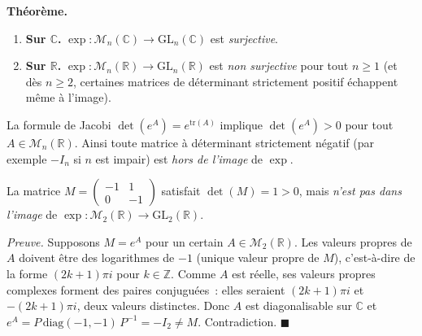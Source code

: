﻿%



\begin{tcolorbox}[thmbox]
  \textbf{Théorème.}\enspace{}
  \begin{enumerate}
    \item \textbf{Sur $\mathbb{C}$.}\enspace
          $\exp : \mathcal{M}_n(\mathbb{C}) \to \mathrm{GL}_n(\mathbb{C})$
          est \emph{surjective}.
    \item \textbf{Sur $\mathbb{R}$.}\enspace
          $\exp : \mathcal{M}_n(\mathbb{R}) \to \mathrm{GL}_n(\mathbb{R})$
          est \emph{non surjective} pour tout $n \geq 1$
          (et dès $n \geq 2$, certaines matrices de déterminant
          strictement positif échappent même à l'image).
  \end{enumerate}
\end{tcolorbox}


\begin{mdframed}[style=cexbar]
  La formule de Jacobi $\det(e^A) = e^{\mathrm{tr}(A)}$
  implique $\det(e^A) > 0$ pour tout $A \in \mathcal{M}_n(\mathbb{R})$.
  Ainsi toute matrice à déterminant strictement négatif
  (par exemple $-I_n$ si $n$ est impair) est \emph{hors de l'image} de $\exp$.
\end{mdframed}


\begin{mdframed}[style=cexbar]
  La matrice $M = \begin{pmatrix}-1 & 1 \\ 0 & -1\end{pmatrix}$
  satisfait $\det(M) = 1 > 0$, mais \emph{n'est pas dans l'image} de
  $\exp : \mathcal{M}_2(\mathbb{R}) \to \mathrm{GL}_2(\mathbb{R})$.

  \smallskip
  \textit{Preuve.} Supposons $M = e^A$ pour un certain $A \in \mathcal{M}_2(\mathbb{R})$.
  Les valeurs propres de $A$ doivent être des logarithmes de $-1$
  (unique valeur propre de $M$), c'est-à-dire de la forme $(2k+1)\pi i$
  pour $k \in \mathbb{Z}$. Comme $A$ est réelle, ses valeurs propres complexes
  forment des paires conjuguées~: elles seraient $(2k+1)\pi i$ et $-(2k+1)\pi i$,
  deux valeurs distinctes. Donc $A$ est diagonalisable sur $\mathbb{C}$ et
  $e^A = P\,\mathrm{diag}(-1,-1)\,P^{-1} = -I_2 \neq M$. Contradiction.
  \hfill$\blacksquare$
\end{mdframed}

